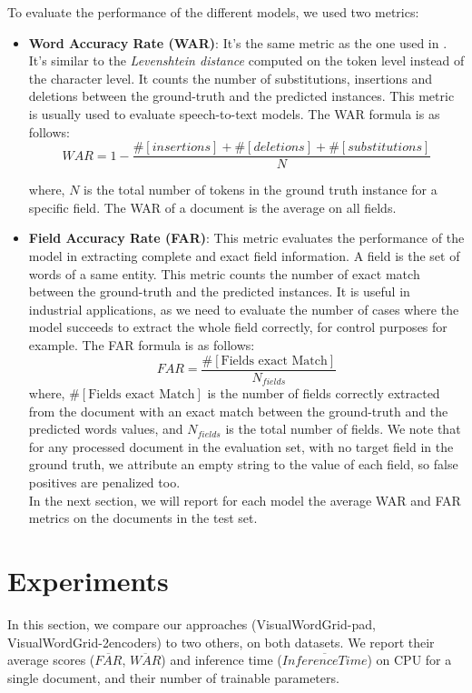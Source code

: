 \documentclass[runningheads]{llncs}
\begin{document}
To evaluate the performance of the different models, we used two metrics:
\begin{itemize}
    \item \textbf{Word Accuracy Rate (WAR)}: It's the same metric as the one used in \cite{chargrid}. It's similar to the \textit{Levenshtein distance}  computed on the token level instead of the character level. It counts the number of substitutions, insertions and deletions between the ground-truth and the predicted instances. This metric is usually used to evaluate speech-to-text models. The WAR formula is as follows:
    \begin{equation}
        WAR = 1 - \frac{\#[insertions] + \#[deletions] + \#[substitutions] }{N}
        \label{eq17}
    \end{equation}

where, $N$ is the total number of tokens in the ground truth instance for a specific field. The WAR of a document is the average on all fields. 

 \item \textbf{Field Accuracy Rate (FAR)}: This metric evaluates the performance of the model in extracting  complete and exact field information. A field is the set of words of a same entity. This metric counts the number of exact match between the ground-truth and the predicted instances. It is useful in industrial applications, as we need to evaluate the number of cases where the model succeeds to extract the whole field correctly, for control purposes for example. The FAR formula is as follows:
 \begin{equation}
FAR = \frac{ \#[\text{Fields exact Match}]}{N_{fields}}
    \label{eq19}
 \end{equation}
where, $\#[\text{Fields exact Match}]$ is the number of fields correctly extracted from the document with an exact match between  the ground-truth and the predicted words values, and $N_{fields}$ is the total number of fields. We note that for any processed document in the evaluation set, with no target field in the ground truth, we attribute an empty string to the value of each field, so false positives are  penalized too.\\
In the next section, we will report for each model the average WAR and FAR metrics on the documents in the test set.
\end{itemize}



\section{Experiments}
In this section, we compare our approaches (VisualWordGrid-pad, VisualWordGrid-2encoders) to two others, on both datasets. We report their average scores ($\overline{FAR}$, $\overline{WAR}$) and inference time ($\overline{InferenceTime}$)  on CPU for a single document, and their number of trainable parameters.
\end{document}
